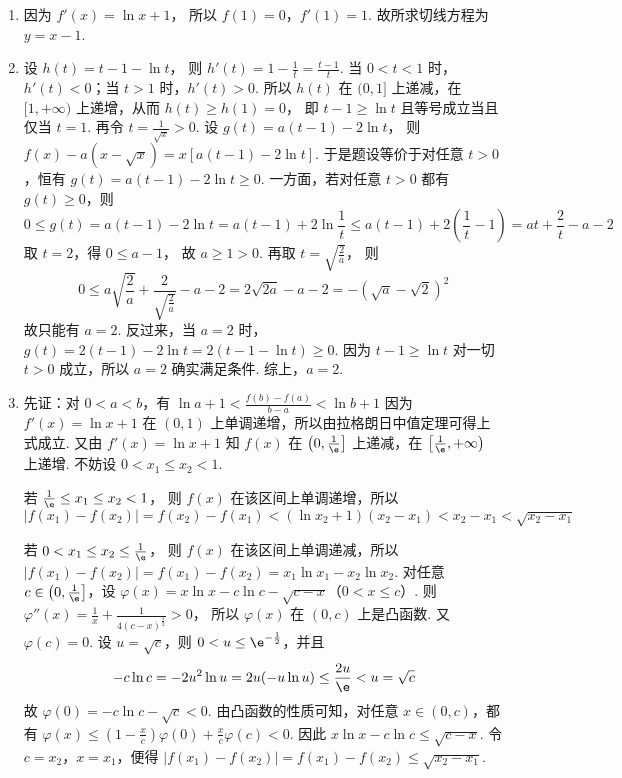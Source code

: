 \begin{solution}
\begin{enumerate}
    \item 因为
\(f'(x)=\ln x+1\)，
所以
\(f(1)=0\)，\(f'(1)=1\).
故所求切线方程为
\(y=x-1\).

    \item 设
\(h(t)=t-1-\ln t\)，
则
\(h'(t)=1-\frac{1}{t}=\frac{t-1}{t}\).
当 \(0<t<1\) 时，\(h'(t)<0\)；当 \(t>1\) 时，\(h'(t)>0\). 所以 \(h(t)\) 在 \((0,1]\) 上递减，在 \([1,+\infty)\) 上递增，从而
\(h(t)\ge h(1)=0\)，
即
\(t-1\ge \ln t\)
且等号成立当且仅当 \(t=1\).
再令
\(t=\frac{1}{\sqrt{x}}>0\).
设
\(g(t)=a(t-1)-2\ln t\)，
则
\(f(x)-a(x-\sqrt{x}) =x\left[a(t-1)-2\ln t\right]\).
于是题设等价于对任意 \(t>0\)，恒有
\(g(t)=a(t-1)-2\ln t\ge 0\).
一方面，若对任意 \(t>0\) 都有 \(g(t)\ge 0\)，则
\[
0\le g(t)=a(t-1)-2\ln t=a(t-1)+2\ln \frac{1}{t}\le a(t-1)+2\left(\frac{1}{t}-1\right)=at+\frac{2}{t}-a-2
\]
取 \(t=2\)，得
\(0\le a-1\)，
故 \(a\ge 1>0\).
再取
\(t=\sqrt{\frac{2}{a}}\)，
则
\[
0\le a\sqrt{\frac{2}{a}}+\frac{2}{\sqrt{\frac{2}{a}}}-a-2=2\sqrt{2a}-a-2=-\left(\sqrt{a}-\sqrt{2}\right)^2
\]
故只能有
\(a=2\).
反过来，当 \(a=2\) 时，
\(g(t)=2(t-1)-2\ln t =2(t-1-\ln t)\ge 0\).
因为 \(t-1\ge \ln t\) 对一切 \(t>0\) 成立，所以 \(a=2\) 确实满足条件.
综上，\(a=2\).

    \item 先证：对 \(0<a<b\)，有
\(\ln a+1<\frac{f(b)-f(a)}{b-a}<\ln b+1\)
因为
\(f'(x)=\ln x+1\)
在 \((0,1)\) 上单调递增，所以由拉格朗日中值定理可得上式成立.
又由
\(f'(x)=\ln x+1\)
知 \(f(x)\) 在 \(\left(0,\frac1\e\right]\) 上递减，在 \(\left[\frac1\e,+\infty\right)\) 上递增.
不妨设 \(0<x_1\le x_2<1\).

若
\(\frac1\e\le x_1\le x_2<1\)，
则 \(f(x)\) 在该区间上单调递增，所以
\[
|f(x_1)-f(x_2)| =f(x_2)-f(x_1) <(\ln x_2+1)(x_2-x_1) <x_2-x_1 <\sqrt{x_2-x_1}
\]

若
\(0<x_1\le x_2\le \frac1\e\)，
则 \(f(x)\) 在该区间上单调递减，所以
\(|f(x_1)-f(x_2)| =f(x_1)-f(x_2) =x_1\ln x_1-x_2\ln x_2\).
对任意 \(c\in \left(0,\frac1\e\right]\)，设
\(\varphi(x)=x\ln x-c\ln c-\sqrt{c-x}\)（\(0<x\le c\)）.
则
\(\varphi''(x)=\frac{1}{x}+\frac{1}{4(c-x)^{\frac{3}{2}}}>0\)，
所以 \(\varphi(x)\) 在 \((0,c)\) 上是凸函数.
又
\(\varphi(c)=0\).
设 \(u=\sqrt{c}\)，则 \(0<u\le \e^{-\frac{1}{2}}\)，并且
\[
-c\ln c=-2u^2\ln u=2u(-u\ln u)\le \frac{2u}{\e}<u=\sqrt{c}
\]
故
\(\varphi(0)=-c\ln c-\sqrt{c}<0\).
由凸函数的性质可知，对任意 \(x\in (0,c)\)，都有
\(\varphi(x)\le \left(1-\frac{x}{c}\right)\varphi(0)+\frac{x}{c}\varphi(c)<0\).
因此
\(x\ln x-c\ln c\le \sqrt{c-x}\).
令 \(c=x_2\)，\(x=x_1\)，便得
\(|f(x_1)-f(x_2)| =f(x_1)-f(x_2) \le \sqrt{x_2-x_1}\).


\end{enumerate}
\end{solution}
